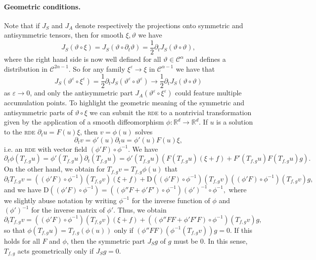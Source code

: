 \documentclass[11pt,a4paper]{article}
\newcommand{\mathD}{\mathrm{D}}
\theoremstyle{remark}
\newcommand{\CC}{\ensuremath{\mathscr{C}}}
\begin{document}
\paragraph{Geometric conditions.}
Note that if $J_{S}$ and $J_{A}$ denote respectively the projections onto
symmetric and antisymmetric tensors, then for smooth $\xi , \vartheta$ we have
\[
   J_{S} ( \vartheta \circ \xi ) = J_{S} ( \vartheta \circ \partial_{t}  \vartheta ) = \frac{1}{2} \partial_{t} J_{S} ( \vartheta \circ  \vartheta ),
\]
where the right hand side is now well defined for all $\vartheta \in \CC^{\alpha}$ and defines a distribution in $\CC^{2 \alpha -1}$. So for any
family $\xi^\varepsilon \rightarrow \xi$ in $\CC^{\alpha -1}$ we have that
\[
   J_S(\vartheta^\varepsilon \circ \xi^\varepsilon) = \frac{1}{2} \partial_{t} J_{S} (\vartheta^\varepsilon \circ   \vartheta^\varepsilon ) \rightarrow \frac{1}{2} \partial_{t} J_{S} ( \vartheta \circ   \vartheta )
\]
as $\varepsilon \rightarrow 0$, and only the antisymmetric part $J_{A} (\vartheta^\varepsilon \circ   \xi^\varepsilon )$ could feature multiple accumulation points.
To highlight the geometric meaning of the symmetric and antisymmetric parts of $\vartheta \circ \xi$ we can submit the \textsc{rde} to a  nontrivial transformation given by the application of a smooth
diffeomorphism $\phi \colon\mathbb{R}^{d} \rightarrow \mathbb{R}^{d}$. If $u$ is
a solution to the \textsc{rde} $\partial_{t} u=F ( u ) \xi$, then $v= \phi ( u )$
solves
\[
   \partial_{t} v= \phi' ( u ) \partial_{t} u= \phi' ( u ) F ( u ) \xi,
\]
i.e. an \textsc{rde} with vector field $( \phi' F ) \circ \phi^{-1}$. We have
\[
   \partial_{t} \phi ( T_{f,g} u ) = \phi' ( T_{f,g} u ) \partial_{t} (T_{f,g} u ) = \phi' ( T_{f,g} u ) ( F ( T_{f,g} u ) ( \xi +f ) +F' (T_{f,g} u ) F ( T_{f,g} u ) g ).
\]
On the other hand, we obtain for $T_{f,g} v=T_{f,g} \phi ( u )$ that
\[
   \partial_{t} T_{f,g} v= ( ( \phi' F ) \circ \phi^{-1} ) ( T_{f,g} v ) ( \xi+f ) + \mathD ( ( \phi' F ) \circ \phi^{-1} ) ( T_{f,g} v ) ( ( \phi' F ) \circ \phi^{-1} ) ( T_{f,g} v ) g,
\]
and we have
$
   \mathD ( ( \phi' F ) \circ \phi^{-1} ) = ( ( \phi'' F+ \phi' F' ) \circ \phi^{-1} ) ( \phi' )^{-1} \circ \phi^{-1} ,
$
where we slightly abuse notation by writing $\phi^{-1}$ for the
inverse function of $\phi$ and $(\phi')^{-1}$ for the inverse matrix of $\phi'$. Thus,
we obtain
\[
   \partial_{t} T_{f,g} v= ( ( \phi' F ) \circ \phi^{-1} ) ( T_{f,g} v ) ( \xi +f ) + ( ( \phi'' FF+ \phi' F' F ) \circ \phi^{-1} ) ( T_{f,g} v ) g,
\]
so that
$
   \phi ( T_{f,g} u ) =T_{f,g} ( \phi ( u ) )
$
only if
$
   ( \phi'' FF ) ( \phi^{-1} ( T_{f,g} v ) ) g=0.
$
If this holds for all $F$ and $\phi$, then the symmetric part $J_{S} g$ of
$g$ must be 0. In this sense, $T_{f,g}$ acts geometrically only if $J_S g=0$.
\end{document}
